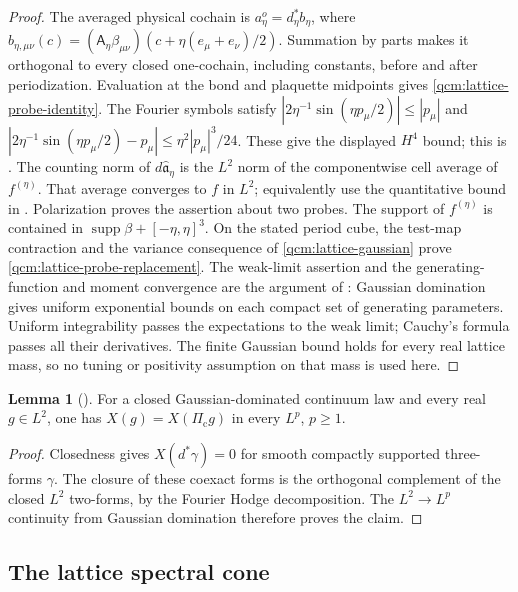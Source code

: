 \documentclass[11pt,letterpaper,reqno]{amsart}
\theoremstyle{definition}
\newtheorem{qcmlemma}[qcmproposition]{Lemma}
\newenvironment{lemma}[1][]{\pushQED{\qed}\renewcommand{\qedsymbol}{$\blacksquare$}\begin{qcmlemma}[#1]}{\popQED\end{qcmlemma}}
\begin{document}
\begin{proof}
The averaged physical cochain is $a_\eta^o=d_\eta^*b_\eta$, where
$b_{\eta,\mu\nu}(c)=(\mathsf A_\eta\beta_{\mu\nu})
(c+\eta(e_\mu+e_\nu)/2)$. Summation by parts makes it orthogonal
to every closed one-cochain, including constants, before and after
periodization. Evaluation at the bond and plaquette midpoints gives
\eqref{qcm:lattice-probe-identity}. The Fourier symbols satisfy
$|2\eta^{-1}\sin(\eta p_\mu/2)|\le|p_\mu|$ and
$|2\eta^{-1}\sin(\eta p_\mu/2)-p_\mu|
\le\eta^2|p_\mu|^3/24$. These give the displayed $H^4$ bound;
this is \cite[equations~(19.1)--(19.5)]{QEDConstruction}.
The counting norm of $d\widehat{\mathfrak a}_\eta$ is the $L^2$
norm of the componentwise cell average of $f^{(\eta)}$. That
average converges to $f$ in $L^2$; equivalently use the quantitative
bound in \cite[equation~(19.10)]{QEDConstruction}. Polarization
proves the assertion about two probes.
The support of $f^{(\eta)}$ is contained in
$\operatorname{supp}\beta+[-\eta,\eta]^3$. On the stated period
cube, the test-map contraction and the variance consequence of
\eqref{qcm:lattice-gaussian} prove
\eqref{qcm:lattice-probe-replacement}. The weak-limit assertion and
the generating-function and moment convergence are the argument of
\cite[Section~6.2]{QEDConstruction}: Gaussian domination gives
uniform exponential bounds on each compact set of generating
parameters. Uniform integrability passes the expectations to the
weak limit; Cauchy's formula passes all their derivatives.
The finite Gaussian bound holds for every real lattice mass, so
no tuning or positivity assumption on that mass is used here.
\end{proof}

\begin{lemma}\label{qcm:closed-L2-projection}
For a closed Gaussian-dominated continuum law and every real
$g\in L^2$, one has
$X(g)=X(\Pi_{\mathrm c}g)$ in every $L^p$, $p\ge1$.
\end{lemma}
\begin{proof}
Closedness gives $X(d^*\gamma)=0$ for smooth compactly supported
three-forms $\gamma$. The closure of these coexact forms is the
orthogonal complement of the closed $L^2$ two-forms, by the Fourier
Hodge decomposition. The $L^2\to L^p$ continuity from Gaussian
domination therefore proves the claim.
\end{proof}

\subsection{The lattice spectral cone}
\label{qcm:lattice-cone-setting}
\end{document}
